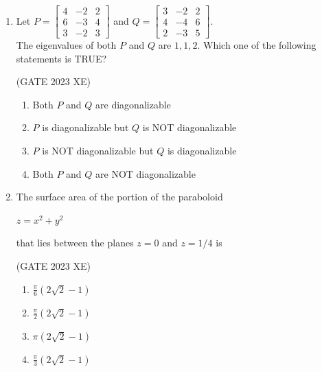 \documentclass[journal,12pt,onecolumn]{IEEEtran}
\newcommand{\myvec}[1]{\begin{bmatrix}#1\end{bmatrix}}
\begin{document}
\begin{enumerate}
\item Let  $P = \myvec{4 & -2 & 2\\ 6 & -3 & 4\\ 3 & -2 & 3}$ and $Q = \myvec{3 & -2 & 2\\ 4 & -4 & 6\\ 2 & -3 & 5}$.\\

The eigenvalues of both $P$ and $Q$ are $1, 1, 2$. Which one of the following
statements is TRUE?

\hfill{(GATE 2023 XE)}

\begin{multicols}{2}

\begin{enumerate}

\item Both $P$ and $Q$ are diagonalizable

\item $P$ is diagonalizable but $Q$ is NOT diagonalizable

\item $P$ is NOT diagonalizable but $Q$ is diagonalizable

\item Both $P$ and $Q$ are NOT diagonalizable

\end{enumerate}

\end{multicols}

\item The surface area of the portion of the paraboloid

$z = x^2 + y^2$

that lies between the planes $z=0$ and $z=1/4$ is

\hfill{(GATE 2023 XE)}

\begin{multicols}{2}

\begin{enumerate}

\item $\frac{\pi}{6} (2\sqrt{2} -1)$

\item $\frac{\pi}{2} (2\sqrt{2} -1)$

\item $\pi (2\sqrt{2} -1)$

\item $\frac{\pi}{3} (2\sqrt{2} -1)$

\end{enumerate}


\end{multicols}
\end{enumerate}
\end{document}
